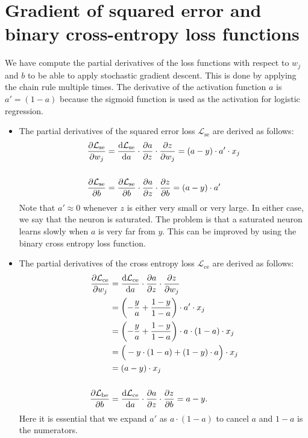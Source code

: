 \documentclass[12pt]{article}
\begin{document}
\section{Gradient of squared error and binary cross-entropy loss functions}

We have compute the partial derivatives of the loss functions with respect to $w_j$ and $b$ to be able to apply stochastic gradient descent. This is done by applying the chain rule multiple times. 
The derivative of the activation function $a$ is $a' = (1-a)$ because the sigmoid function is used as the activation for logistic regression.
\begin{itemize}
\item 
The partial derivatives of the squared error loss $\mathcal{L}_\mathrm{se}$ are derived as follows:
\begin{align}
{\partial \mathcal{L}_\mathrm{se} \over \partial w_j}
&=  
{\mathrm{d} \mathcal{L}_\mathrm{se} \over \mathrm{d}a} \cdot {\partial a \over \partial z} \cdot {\partial z \over \partial w_j} =
(a - y) \cdot a' \cdot x_j  \\
& \notag \\
%
{\partial \mathcal{L}_\mathrm{se} \over \partial b} 
&=
{\partial \mathcal{L}_\mathrm{se} \over \partial b} \cdot  {\partial a \over \partial z} \cdot {\partial z \over \partial b} =
(a - y) \cdot a'
\end{align}
Note that $a'\approx 0$ whenever $z$ is either very small or very large. In either case, we say that the neuron is saturated. The problem is that a saturated neuron learns slowly when $a$ is very far from $y$. This can be improved by using the binary cross entropy loss function.
\item
The partial derivatives of the cross entropy loss $\mathcal{L}_\mathrm{ce}$ are derived as follows:
\begin{align}
{\partial \mathcal{L}_\mathrm{ce} \over \partial w_j}
&=  
{\mathrm{d} \mathcal{L}_\mathrm{ce} \over \mathrm{d}a} \cdot {\partial a \over \partial z} \cdot {\partial z \over \partial w_j} \\
&= 
\left(-\frac{y}{a} + \frac{1-y}{1-a} \right) \cdot a' \cdot x_j  \\
&=
\left(-\frac{y}{a} + \frac{1-y}{1-a} \right) \cdot a \cdot (1 - a) \cdot x_j  \\
&=
\Big( - y \cdot  (1 - a) + (1-y) \cdot a \Big) \cdot x_j \\
&=
(a - y) \cdot x_j \\
%
& \notag \\
{\partial \mathcal{L}_\mathrm{be} \over \partial b} 
&=
{\mathrm{d} \mathcal{L}_\mathrm{ce} \over \mathrm{d}a} \cdot {\partial a \over \partial z} \cdot {\partial z \over \partial b} = 
a - y.
\end{align}
Here it is essential that we expand $a'$ as $a \cdot (1-a)$ to cancel $a$ and $1-a$ is the numerators.
\end{itemize}
\end{document}
